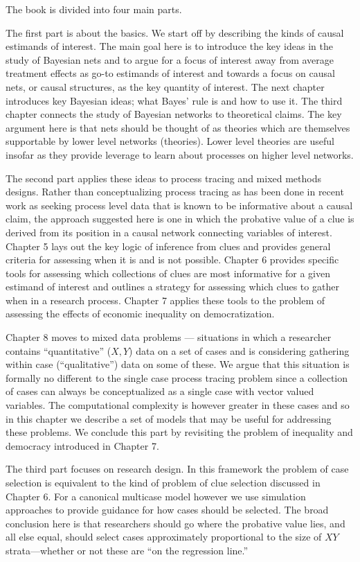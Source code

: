 \documentclass[
  12pt,
]{book}
\begin{document}
The book is divided into four main parts.

The first part is about the basics. We start off by describing the kinds of causal estimands of interest. The main goal here is to introduce the key ideas in the study of Bayesian nets and to argue for a focus of interest away from average treatment effects as go-to estimands of interest and towards a focus on causal nets, or causal structures, as the key quantity of interest. The next chapter introduces key Bayesian ideas; what Bayes' rule is and how to use it. The third chapter connects the study of Bayesian networks to theoretical claims. The key argument here is that nets should be thought of as theories which are themselves supportable by lower level networks (theories). Lower level theories are useful insofar as they provide leverage to learn about processes on higher level networks.

The second part applies these ideas to process tracing and mixed methods designs. Rather than conceptualizing process tracing as has been done in recent work as seeking process level data that is known to be informative about a causal claim, the approach suggested here is one in which the probative value of a clue is derived from its position in a causal network connecting variables of interest. Chapter 5 lays out the key logic of inference from clues and provides general criteria for assessing when it is and is not possible. Chapter 6 provides specific tools for assessing which collections of clues are most informative for a given estimand of interest and outlines a strategy for assessing which clues to gather when in a research process. Chapter 7 applies these tools to the problem of assessing the effects of economic inequality on democratization.

Chapter 8 moves to mixed data problems --- situations in which a researcher contains ``quantitative'' (\(X,Y\)) data on a set of cases and is considering gathering within case (``qualitative'') data on some of these. We argue that this situation is formally no different to the single case process tracing problem since a collection of cases can always be conceptualized as a single case with vector valued variables. The computational complexity is however greater in these cases and so in this chapter we describe a set of models that may be useful for addressing these problems. We conclude this part by revisiting the problem of inequality and democracy introduced in Chapter 7.

The third part focuses on research design. In this framework the problem of case selection is equivalent to the kind of problem of clue selection discussed in Chapter 6. For a canonical multicase model however we use simulation approaches to provide guidance for how cases should be selected. The broad conclusion here is that researchers should go where the probative value lies, and all else equal, should select cases approximately proportional to the size of \(XY\) strata---whether or not these are ``on the regression line.''
\end{document}
